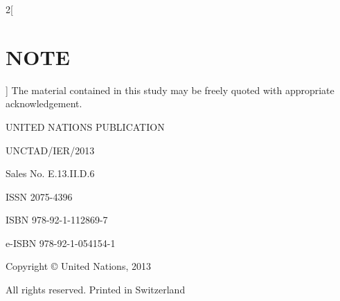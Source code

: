 \documentclass[a4paper, UTF8, 12pt]{article}
\begin{document}
\begin{paracol}{2}[\section{NOTE}]
    \switchcolumn
    The material contained in this study may be freely quoted with appropriate acknowledgement.

    \begin{center}
        UNITED NATIONS PUBLICATION 

        UNCTAD/IER/2013 

        Sales No. E.13.II.D.6

        ISSN 2075-4396 

        ISBN 978-92-1-112869-7 

        e-ISBN 978-92-1-054154-1 

        Copyright © United Nations, 2013

        All rights reserved. Printed in Switzerland
    \end{center}

\end{paracol}
\end{document}
